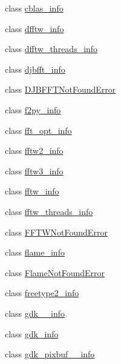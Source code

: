 \begin{DoxyCompactItemize}
\item 
class \hyperlink{classnumpy_1_1distutils_1_1system__info_1_1cblas__info}{cblas\+\_\+info}
\item 
class \hyperlink{classnumpy_1_1distutils_1_1system__info_1_1dfftw__info}{dfftw\+\_\+info}
\item 
class \hyperlink{classnumpy_1_1distutils_1_1system__info_1_1dfftw__threads__info}{dfftw\+\_\+threads\+\_\+info}
\item 
class \hyperlink{classnumpy_1_1distutils_1_1system__info_1_1djbfft__info}{djbfft\+\_\+info}
\item 
class \hyperlink{classnumpy_1_1distutils_1_1system__info_1_1DJBFFTNotFoundError}{D\+J\+B\+F\+F\+T\+Not\+Found\+Error}
\item 
class \hyperlink{classnumpy_1_1distutils_1_1system__info_1_1f2py__info}{f2py\+\_\+info}
\item 
class \hyperlink{classnumpy_1_1distutils_1_1system__info_1_1fft__opt__info}{fft\+\_\+opt\+\_\+info}
\item 
class \hyperlink{classnumpy_1_1distutils_1_1system__info_1_1fftw2__info}{fftw2\+\_\+info}
\item 
class \hyperlink{classnumpy_1_1distutils_1_1system__info_1_1fftw3__info}{fftw3\+\_\+info}
\item 
class \hyperlink{classnumpy_1_1distutils_1_1system__info_1_1fftw__info}{fftw\+\_\+info}
\item 
class \hyperlink{classnumpy_1_1distutils_1_1system__info_1_1fftw__threads__info}{fftw\+\_\+threads\+\_\+info}
\item 
class \hyperlink{classnumpy_1_1distutils_1_1system__info_1_1FFTWNotFoundError}{F\+F\+T\+W\+Not\+Found\+Error}
\item 
class \hyperlink{classnumpy_1_1distutils_1_1system__info_1_1flame__info}{flame\+\_\+info}
\item 
class \hyperlink{classnumpy_1_1distutils_1_1system__info_1_1FlameNotFoundError}{Flame\+Not\+Found\+Error}
\item 
class \hyperlink{classnumpy_1_1distutils_1_1system__info_1_1freetype2__info}{freetype2\+\_\+info}
\item 
class \hyperlink{classnumpy_1_1distutils_1_1system__info_1_1gdk__2__info}{gdk\+\_\+\_\+info}
\item 
class \hyperlink{classnumpy_1_1distutils_1_1system__info_1_1gdk__info}{gdk\+\_\+info}
\item 
class \hyperlink{classnumpy_1_1distutils_1_1system__info_1_1gdk__pixbuf__2__info}{gdk\+\_\+pixbuf\+\_\+\_\+info}

\end{DoxyCompactItemize}
